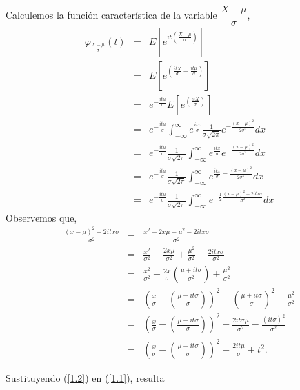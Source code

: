 \documentclass[
  letterpaper,
  DIV=11,
  numbers=noendperiod]{scrreprt}
\begin{document}
Calculemos la función característica de la variable
\(\dfrac{X-\mu}{\sigma}\), \begin{eqnarray}\label{1.1}
\varphi_{\frac{X-\mu}{\sigma}}(t) & = & E\left[e^{it\left(\frac{X-\mu}{\sigma}\right)}\right]\nonumber\\
& = & E\left[e^{\left(\frac{itX}{\sigma}-\frac{it\mu}{\sigma}\right)}\right]\nonumber\\
& = & e^{-\frac{it\mu}{\sigma}}E\left[e^{\left(\frac{itX}{\sigma}\right)}\right]\nonumber\\
& = & e^{-\frac{it\mu}{\sigma}}\int_{-\infty}^{\infty}e^{\frac{itx}{\sigma}}\frac{1}{\sigma\sqrt{2\pi}}e^{-\frac{(x-\mu)^{2}}{2\sigma^{2}}}dx\nonumber\\
& = & e^{-\frac{it\mu}{\sigma}}\frac{1}{\sigma\sqrt{2\pi}}\int_{-\infty}^{\infty}e^{\frac{itx}{\sigma}}e^{-\frac{(x-\mu)^{2}}{2\sigma^{2}}}dx\nonumber\\
& = & e^{-\frac{it\mu}{\sigma}}\frac{1}{\sigma\sqrt{2\pi}}\int_{-\infty}^{\infty}e^{\frac{itx}{\sigma}-\frac{(x-\mu)^{2}}{2\sigma^{2}}}dx\nonumber\\
& = & e^{-\frac{it\mu}{\sigma}}\frac{1}{\sigma\sqrt{2\pi}}\int_{-\infty}^{\infty}e^{-\frac{1}{2}\frac{(x-\mu)^{2}-2itx\sigma}{\sigma^{2}}}dx
\end{eqnarray} Observemos que, \begin{eqnarray}\label{1.2}
\frac{(x-\mu)^{2}-2itx\sigma}{\sigma^{2}} & = & \frac{x^{2}-2x\mu+\mu^{2}-2itx\sigma}{\sigma^{2}}\nonumber\\
& = & \frac{x^{2}}{\sigma^{2}}-\frac{2x\mu}{\sigma^{2}}+\frac{\mu^{2}}{\sigma^{2}}-\frac{2itx\sigma}{\sigma^{2}}\nonumber\\
& = & \frac{x^{2}}{\sigma^{2}}-\frac{2x}{\sigma}\left(\frac{\mu+it\sigma}{\sigma^{2}}\right)+\frac{\mu^{2}}{\sigma^{2}}\nonumber\\
& = & \left(\frac{x}{\sigma}-\left(\frac{\mu+it\sigma}{\sigma}\right)\right)^{2}-\left(\frac{\mu+it\sigma}{\sigma}\right)^{2}+\frac{\mu^{2}}{\sigma^{2}}\nonumber\\
& = & \left(\frac{x}{\sigma}-\left(\frac{\mu+it\sigma}{\sigma}\right)\right)^{2}-\frac{2 it\sigma\mu}{\sigma^{2}}-\frac{(it\sigma)^{2}}{\sigma^{2}}\nonumber\\
& = & \left(\frac{x}{\sigma}-\left(\frac{\mu+it\sigma}{\sigma}\right)\right)^{2}-\frac{2 it\mu}{\sigma}+t^{2}.
\end{eqnarray}

Sustituyendo (\ref{1.2}) en (\ref{1.1}), resulta
\end{document}
